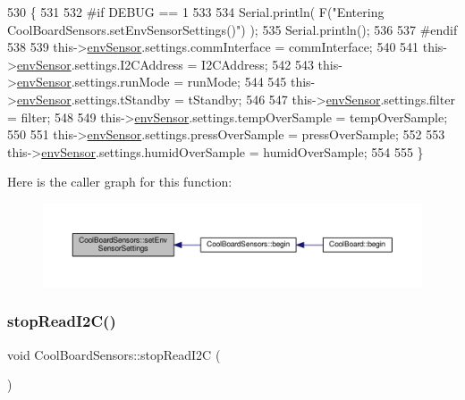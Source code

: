 \begin{DoxyCode}
530 \{
531 
532 \textcolor{preprocessor}{#if DEBUG == 1}
533     
534     Serial.println( F(\textcolor{stringliteral}{"Entering CoolBoardSensors.setEnvSensorSettings()"}) );
535     Serial.println();
536 
537 \textcolor{preprocessor}{#endif}
538   
539     this->\hyperlink{classCoolBoardSensors_a868e38985e9a2412829fa2790ca13e2e}{envSensor}.settings.commInterface = commInterface;      
540 
541     this->\hyperlink{classCoolBoardSensors_a868e38985e9a2412829fa2790ca13e2e}{envSensor}.settings.I2CAddress = I2CAddress;
542 
543     this->\hyperlink{classCoolBoardSensors_a868e38985e9a2412829fa2790ca13e2e}{envSensor}.settings.runMode = runMode; 
544 
545     this->\hyperlink{classCoolBoardSensors_a868e38985e9a2412829fa2790ca13e2e}{envSensor}.settings.tStandby = tStandby; 
546 
547     this->\hyperlink{classCoolBoardSensors_a868e38985e9a2412829fa2790ca13e2e}{envSensor}.settings.filter = filter; 
548 
549     this->\hyperlink{classCoolBoardSensors_a868e38985e9a2412829fa2790ca13e2e}{envSensor}.settings.tempOverSample = tempOverSample;
550 
551     this->\hyperlink{classCoolBoardSensors_a868e38985e9a2412829fa2790ca13e2e}{envSensor}.settings.pressOverSample = pressOverSample;
552 
553     this->\hyperlink{classCoolBoardSensors_a868e38985e9a2412829fa2790ca13e2e}{envSensor}.settings.humidOverSample = humidOverSample;
554 
555 \}
\end{DoxyCode}
Here is the caller graph for this function\+:\nopagebreak
\begin{figure}[H]
\begin{center}
\leavevmode
\includegraphics[width=350pt]{classCoolBoardSensors_a406307ffd70272282d91479c7ed8d66f_icgraph}
\end{center}
\end{figure}
\mbox{\label{classCoolBoardSensors_ab67b900b9e5e7c18d52d2d9107ba171b}} 
\subsubsection{\texorpdfstring{stop\+Read\+I2\+C()}{stopReadI2C()}}
{\footnotesize\ttfamily void Cool\+Board\+Sensors\+::stop\+Read\+I2C (\begin{DoxyParamCaption}{ }\end{DoxyParamCaption})}

